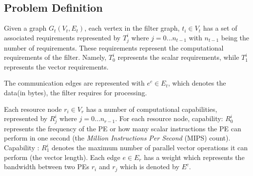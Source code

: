 \documentclass[10pt, conference, compsocconf, reqno]{IEEEtran}
\begin{document}
\subsection{Problem Definition}

Given a graph $G_t(V_t, E_t)$, each vertex in the filter graph, $t_i \in
V_t$ has a set of associated requirements represented by $T^{i}_{j}$
where $j=0...n_{t-1}$ with $n_{t-1}$ being the number of
requirements. These requirements represent the computational
requirements of the filter. Namely, $T^i_0$ represents the scalar
requirements, while $T^i_1$ represents the vector requirements.


The communication edges are represented with \mbox{$e^c \in E_t$}, which
denotes the data(in bytes), the filter requires for processing.



Each resource node $r_i \in V_r$ has a number of computational
capabilities, represented by $R^{i}_{j}$ where $j=0...n_{r-1}$.
For each resource node, capability: $R^i_0$ represents the frequency of the PE or
how many scalar instructions the PE can perform in one second (the
\textit{Million Instructions Per Second} (MIPS) count). Capability :
$R^i_1$ denotes the maximum number of parallel vector operations it can
perform (the vector length). Each edge $e \in E_r$ has a weight which
represents the bandwidth between two PEs $r_i$ and $r_j$ which is
denoted by $E^c$.
\end{document}

